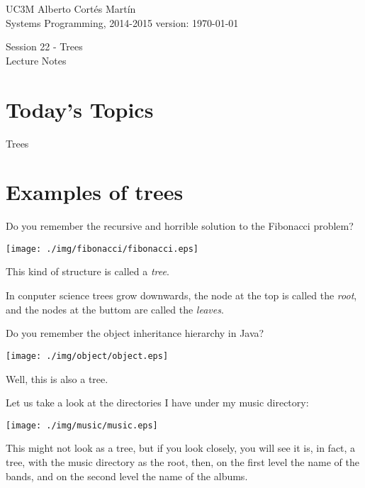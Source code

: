 \documentclass[a4paper, 9pt]{extarticle}
\newcommand{\realtitle}{Session 22 - Trees}
\newcommand{\separator}{\begin{center}%
\noindent\makebox[\linewidth]{\rule{0.75\paperwidth}{0.4pt}}%
\end{center}}
\begin{document}
\makebox[\linewidth]{\rule{\textwidth}{0.4pt}}
UC3M \hfill Alberto Cortés Martín\\
Systems Programming, 2014-2015 \hfill version: \today\\
\makebox[\linewidth]{\rule{\textwidth}{0.4pt}}
\begin{center}
  \Large{\realtitle}\\Lecture Notes
\end{center}
\makebox[\linewidth]{\rule{\textwidth}{0.4pt}}
\vspace{1cm}


\section{Today's Topics}
\begin{blackboard}
Trees
\end{blackboard}

\section{Examples of trees}

Do you remember the recursive and horrible solution to the Fibonacci problem?

\begin{center}
\texttt{[image: ./img/fibonacci/fibonacci.eps]}
\end{center}

This kind of structure is called a \emph{tree}.

In conputer science trees grow downwards, the node at the top is called the
\emph{root}, and the nodes at the buttom are called the \emph{leaves}.

\separator

Do you remember the object inheritance hierarchy in Java?

\begin{center}
\texttt{[image: ./img/object/object.eps]}
\end{center}

Well, this is also a tree.

\separator
\newpage

Let us take a look at the directories I have under my music directory:

\begin{center}
\texttt{[image: ./img/music/music.eps]}
\end{center}

This might not look as a tree, but if you look closely, you will see it is, in
fact, a tree, with the music directory as the root, then, on the first level
the name of the bands, and on the second level the name of the albums.
\end{document}
